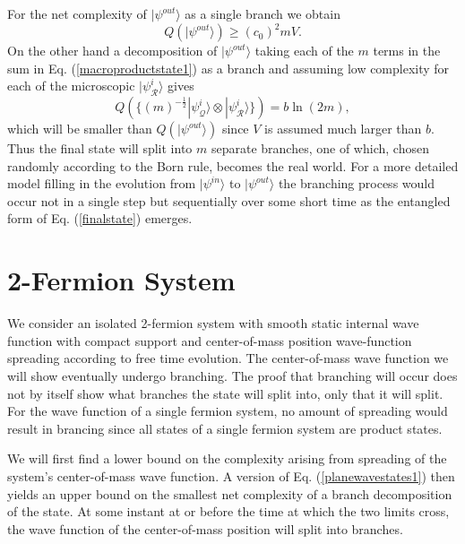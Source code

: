 \documentclass[12pt,amsmath,amssymb,onecolumn]{revtex4-2}
\begin{document}
For the net complexity of $|\psi^{out} \rangle $ as a single branch we obtain
\begin{equation}
\label{psioutQ}
Q( |\psi^{out} \rangle ) \ge (c_0)^2 m V.
\end{equation}
On the other hand a decomposition of $|\psi^{out} \rangle $ 
taking each of the $m$ terms in the sum in Eq. (\ref{macroproductstate1})
as a branch and assuming
low complexity for each of the microscopic $|\psi^i_{\mathcal{R}} \rangle $ gives
\begin{equation}
\label{psioutQ1}
Q( \{(m)^{-\frac{1}{2}}|\psi^i_{\mathcal{Q}} \rangle  \otimes |\psi^i_{\mathcal{R}} \rangle  \}) = b \ln( 2 m),
\end{equation}
which will be smaller than $Q( |\psi^{out} \rangle )$ since $V$ is assumed
much larger than $b$.
Thus the final state will split into $m$ separate branches, one of which, chosen randomly
according to the Born rule, becomes the real world. 
For a more detailed model filling in the evolution from $|\psi^{in} \rangle $ to $|\psi^{out} \rangle $
the branching process would occur not in a single step
but sequentially over some short time as the entangled form of Eq. (\ref{finalstate}) emerges.



\section{\label{sec:2particles} 2-Fermion System}

We consider
an isolated 2-fermion system with smooth static internal
wave function with compact support and 
center-of-mass position wave-function
spreading according to free time evolution.
The center-of-mass wave function we will show
eventually undergo branching. 
The proof that branching will occur
does not by itself show what branches the
state will split into, only that it will split.
For the wave function of a single fermion system,
no amount of spreading would result in brancing since
all states of a single fermion system are product states.

We will first find a lower bound on the complexity arising
from spreading of the system's center-of-mass wave function.
A version of Eq. (\ref{planewavestates1})
then yields an upper bound on the smallest net complexity of a branch decomposition of 
the state. At some instant at or before the time at which
the two limits cross,
the wave function of the center-of-mass position will split into branches.
\end{document}

